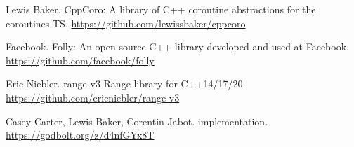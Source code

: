 \documentclass{wg21}
\begin{document}
\begin{thebibliography}{9}
    Lewis Baker.
    CppCoro: A library of C++ coroutine abstractions for the coroutines TS.
    \url{https://github.com/lewissbaker/cppcoro}

    Facebook.
    Folly: An open-source C++ library developed and used at Facebook.
    \url{https://github.com/facebook/folly}

    Eric Niebler.
    range-v3 Range library for C++14/17/20.
    \url{https://github.com/ericniebler/range-v3}

    Casey Carter, Lewis Baker, Corentin Jabot.
     implementation.
    \url{https://godbolt.org/z/d4nfGYx8T}
\end{thebibliography}
\end{document}
